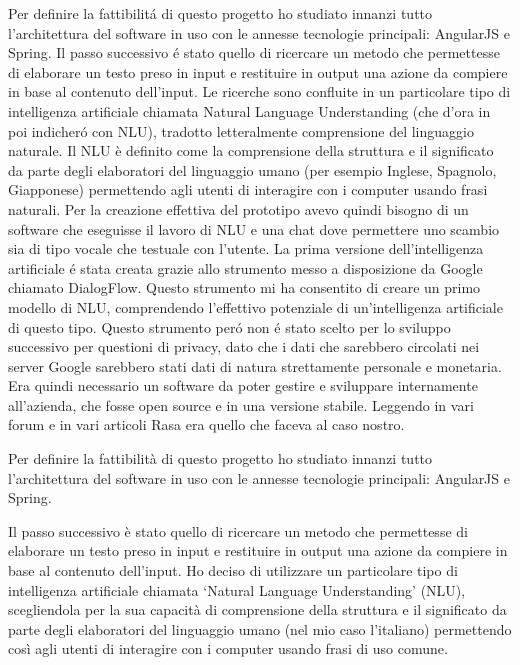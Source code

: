 Per definire la fattibilit\'{a} di questo progetto ho studiato innanzi tutto l'architettura del software in uso con le annesse tecnologie principali: AngularJS e Spring.
Il passo successivo \'{e} stato quello di ricercare un metodo che permettesse di elaborare un testo preso in input e restituire in output una azione da compiere in base al contenuto dell'input. Le ricerche sono confluite in un particolare tipo di intelligenza artificiale chiamata Natural Language Understanding (che d'ora in poi indicher\'{o} con NLU), tradotto letteralmente comprensione del linguaggio naturale. 
Il NLU \`{e} definito come la comprensione della struttura e il significato da parte degli elaboratori del linguaggio umano (per esempio Inglese, Spagnolo, Giapponese) permettendo agli utenti di interagire con i computer usando frasi naturali.
Per la creazione effettiva del prototipo avevo quindi bisogno di un software che eseguisse il lavoro di NLU e una chat dove permettere uno scambio sia di tipo vocale che testuale con l'utente.
La prima versione dell'intelligenza artificiale \'e stata creata grazie allo strumento messo a disposizione da Google chiamato DialogFlow. Questo strumento mi ha consentito di creare un primo modello di NLU, comprendendo l'effettivo potenziale di un'intelligenza artificiale di questo tipo. 
Questo strumento per\'o non \'e stato scelto per lo sviluppo successivo per questioni di privacy, dato che i dati che sarebbero circolati nei server Google sarebbero stati dati di natura strettamente personale e monetaria.
Era quindi necessario un software da poter gestire e sviluppare internamente all'azienda, che fosse open source e in una versione stabile. Leggendo in vari forum e in vari articoli Rasa era quello che faceva al caso nostro.





Per definire la fattibilità di questo progetto ho studiato innanzi tutto l’architettura del software in uso con le annesse tecnologie principali: AngularJS e Spring.

Il passo successivo è stato quello di ricercare un metodo che permettesse di elaborare un testo preso in input e restituire in output una azione da compiere in base al contenuto dell’input. Ho deciso di utilizzare un particolare tipo di intelligenza artificiale chiamata ‘Natural Language Understanding’ (NLU), scegliendola per la sua capacità di comprensione della struttura e il significato da parte degli elaboratori del linguaggio umano (nel mio caso l’italiano) permettendo così agli utenti di interagire con i computer usando frasi di uso comune.

